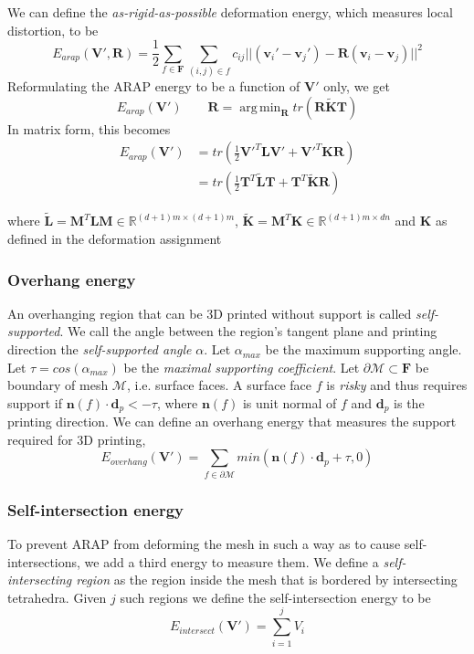 \documentclass[12pt]{article}
\newcommand{\R}{\mathbb{R}}
\newcommand{\calM}{\mathcal{M}}
\newcommand{\bL}{\mathbf{L}}
\newcommand{\bV}{\mathbf{V}}
\newcommand{\bF}{\mathbf{F}}
\newcommand{\bR}{\mathbf{R}}
\newcommand{\bM}{\mathbf{M}}
\newcommand{\bT}{\mathbf{T}}
\newcommand{\bv}{\mathbf{v}}
\newcommand{\bK}{\mathbf{K}}
\newcommand{\bn}{\mathbf{n}}
\newcommand{\bd}{\mathbf{d}}
\DeclareMathOperator*{\argmin}{arg\,min} %
\begin{document}
\begin{multicols}{2}
We can define the \textit{as-rigid-as-possible} deformation energy, which measures local distortion, to be
\[
    E_{arap}(\bV', \bR) = \frac{1}{2} \sum_{f\in \bF} \sum_{(i,j)\in f} c_{ij} || (\bv_i' - \bv_j') - \bR(\bv_i - \bv_j) ||^2
\]
Reformulating the ARAP energy to be a function of $\bV'$ only, we get
\[
    E_{arap}(\bV')
    \qquad
    \bR = \argmin_{\bR} tr(\bR\tilde{\bK}\bT)
\]
In matrix form, this becomes
\begin{align*}
E_{arap}(\bV') 
    &= tr(\frac{1}{2}\bV'^T \bL \bV' + \bV'^T \bK \bR ) \\
    &= tr(\frac{1}{2}\bT^T \tilde{\bL} \bT + \bT^T \tilde{\bK} \bR)
\end{align*}
    
where $\tilde{\bL} = \bM^T \bL \bM \in \R^{(d+1)m \times (d+1)m}$, $\tilde{\bK} = \bM^T \bK \in \R^{(d+1)m \times dn}$ and $\bK$ as defined in the deformation assignment

\subsubsection*{Overhang energy}

An overhanging region that can be 3D printed without support is called \textit{self-supported}. We call the angle between the region's tangent plane and printing direction the \textit{self-supported angle} $\alpha$. Let $\alpha_{max}$ be the maximum supporting angle. Let $\tau = cos(\alpha_{max})$ be the \textit{maximal supporting coefficient}. Let $\partial \calM \subset \bF$ be boundary of mesh $\calM$, i.e. surface faces. A surface face $f$ is \textit{risky} and thus requires support if $\bn(f) \cdot \bd_{p} < -\tau$, where $\bn(f)$ is unit normal of $f$ and $\bd_{p}$ is the printing direction. We can define an overhang energy that measures the support required for 3D printing,
\[
    E_{overhang}(\bV') = \sum_{f\in \partial \calM} min(\bn(f) \cdot \bd_{p} + \tau, 0)
\]


\subsubsection*{Self-intersection energy}

To prevent ARAP from deforming the mesh in such a way as to cause self-intersections, we add a third energy to measure them. We define a \textit{self-intersecting region} as the region inside the mesh that is bordered by intersecting tetrahedra. Given $j$ such regions we define the self-intersection energy to be
\[
	E_{intersect}(\bV') = \sum_{i=1}^j V_i
\]


\end{multicols}
\end{document}
